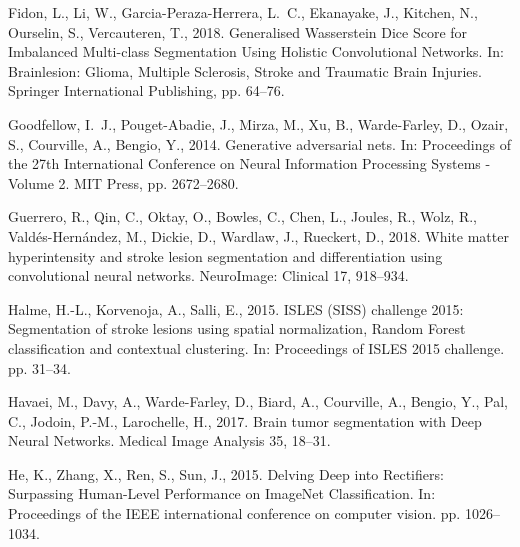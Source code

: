 \documentclass[letterpaper,final,authoryear,3p,times,twocolumn]{elsarticle}
\begin{document}
\begin{thebibliography}{36}
Fidon, L., Li, W., Garcia-Peraza-Herrera, L.~C., Ekanayake, J., Kitchen, N.,
  Ourselin, S., Vercauteren, T., 2018. {Generalised Wasserstein Dice Score for
  Imbalanced Multi-class Segmentation Using Holistic Convolutional Networks}.
  In: Brainlesion: Glioma, Multiple Sclerosis, Stroke and Traumatic Brain
  Injuries. Springer International Publishing, pp. 64--76.

Goodfellow, I.~J., Pouget-Abadie, J., Mirza, M., Xu, B., Warde-Farley, D.,
  Ozair, S., Courville, A., Bengio, Y., 2014. {Generative adversarial nets}.
  In: Proceedings of the 27th International Conference on Neural Information
  Processing Systems - Volume 2. MIT Press, pp. 2672--2680.

Guerrero, R., Qin, C., Oktay, O., Bowles, C., Chen, L., Joules, R., Wolz, R.,
  Vald{\'{e}}s-Hern{\'{a}}ndez, M., Dickie, D., Wardlaw, J., Rueckert, D.,
  2018. {White matter hyperintensity and stroke lesion segmentation and
  differentiation using convolutional neural networks}. NeuroImage: Clinical
  17, 918--934.

Halme, H.-L., Korvenoja, A., Salli, E., 2015. {ISLES (SISS) challenge 2015:
  Segmentation of stroke lesions using spatial normalization, Random Forest
  classification and contextual clustering}. In: Proceedings of ISLES 2015
  challenge. pp. 31--34.

Havaei, M., Davy, A., Warde-Farley, D., Biard, A., Courville, A., Bengio, Y.,
  Pal, C., Jodoin, P.-M., Larochelle, H., 2017. {Brain tumor segmentation with
  Deep Neural Networks}. Medical Image Analysis 35, 18--31.

He, K., Zhang, X., Ren, S., Sun, J., 2015. {Delving Deep into Rectifiers:
  Surpassing Human-Level Performance on ImageNet Classification}. In:
  Proceedings of the IEEE international conference on computer vision. pp.
  1026--1034.


\end{thebibliography}
\end{document}
